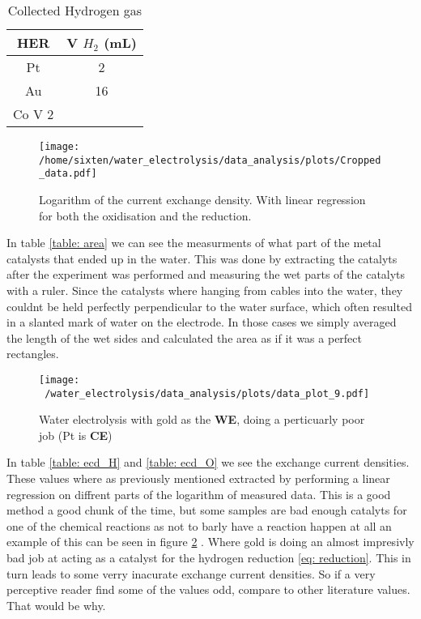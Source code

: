 \documentclass[twocolumn]{revtex4-2}
\begin{document}
\begin{table}
	\begin{tabular}{c | c}
		HER & V $H_2$ (mL) \\
		\hline
		\hline
		Pt & 2 \\
		Au & 16 \\
		Co V 2 \\
	\end{tabular}
	\caption{Collected Hydrogen gas\label{table: gases}}
	
\end{table}
\begin{figure}[h]
	\texttt{[image: /home/sixten/water\_electrolysis/data\_analysis/plots/Cropped\_data.pdf]}
	
	\caption{Logarithm of the current exchange density. With linear regression for both 
	the oxidisation and the reduction.\label{fig: CD_plat}}
\end{figure}

In table \ref{table: area} we can see the measurments of what part of the metal catalysts
that ended up in the water. This was done by extracting the catalyts after the experiment
was performed and measuring the wet parts of the catalyts with a ruler. Since the catalysts 
where hanging from cables into the water, they couldnt be held perfectly perpendicular to 
the water surface, which often resulted in a slanted mark of water on the electrode.
In those cases we simply averaged the length of the wet sides and calculated the area as 
if it was a perfect rectangles. 

\par 

\begin{figure}[h]
	\texttt{[image: ~/water\_electrolysis/data\_analysis/plots/data\_plot\_9.pdf]}
	\caption{Water electrolysis with gold as the \textbf{WE}, doing a perticuarly poor job (Pt 
	is \textbf{CE})\label{figure: Au_Pt_current}}
\end{figure}

In table \ref{table: ecd_H} and \ref{table: ecd_O} we see the exchange current densities.
These values where as previously mentioned extracted by performing a linear regression on 
diffrent parts of the logarithm of measured data. This is a good method a good chunk of the 
time, but some samples are bad enough catalyts for one of the chemical reactions as not to 
barly have a reaction happen at all an example of this can be seen in figure \ref{figure: Au_Pt_current}
. Where gold is doing an almost impresivly bad job at acting as a catalyst for the hydrogen reduction
\ref{eq: reduction}. This in turn leads to some verry inacurate exchange current densities. So if 
a very perceptive reader find some of the values odd, compare to other literature values. That would
be why.
\end{document}
